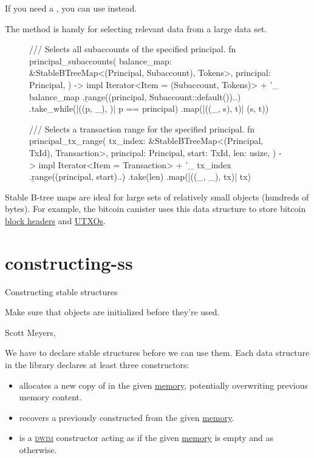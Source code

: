 \documentclass{article}
\begin{document}
If you need a , you can use  instead.

The  method is handy for selecting relevant data from a large data set.

\begin{figure}
\label{range-scan-example}
\begin{code}[rust]
/// Selects all subaccounts of the specified principal.
fn principal_subaccounts(
  balance_map: &StableBTreeMap<(Principal, Subaccount), Tokens>,
  principal: Principal,
) -> impl Iterator<Item = (Subaccount, Tokens)> + '_ {
  balance_map
    .\b{range}((principal, Subaccount::default())..)
    .take_while(|((p, _), )| p == principal)
    .map(|((_, s), t)| (s, t))
}

/// Selects a transaction range for the specified principal.
fn principal_tx_range(
  tx_index: &StableBTreeMap<(Principal, TxId), Transaction>,
  principal: Principal,
  start: TxId,
  len: usize,
) -> impl Iterator<Item = Transaction> + '_ {
  tx_index
    .\b{range}((principal, start)..)
    .take(len)
    .map(|((_, _), tx)| tx)
}
\end{code}
\end{figure}

Stable B-tree maps are ideal for large sets of relatively small objects (hundreds of bytes).
For example, the bitcoin canister uses this data structure to store bitcoin \href{https://github.com/dfinity/bitcoin-canister/blob/9242d5f9a784ac115c2042fd09705dd9321ff7b7/canister/src/block_header_store.rs#L13}{block headers} and \href{https://github.com/dfinity/bitcoin-canister/blob/9242d5f9a784ac115c2042fd09705dd9321ff7b7/canister/src/utxo_set/utxos.rs}{UTXOs}.

\section{constructing-ss}{Constructing stable structures}
\epigraph{
  Make sure that objects are initialized before they're used.
}{Scott Meyers, \cite{Effective C++, third edition, Item 4, p. 26}}

We have to declare stable structures before we can use them.
Each data structure  in the library declares at least three constructors:
\begin{itemize}
  \item{} allocates a new copy of  in the given \href{#memory}{memory}, potentially overwriting previous memory content.
  \item{} recovers a previously constructed  from the given \href{#memory}{memory}.
  \item{} is a \href{https://en.wikipedia.org/wiki/DWIM}{\textsc{dwim}} constructor acting as  if the given \href{#memory}{memory} is empty and as  otherwise.
\end{itemize}
\end{document}
